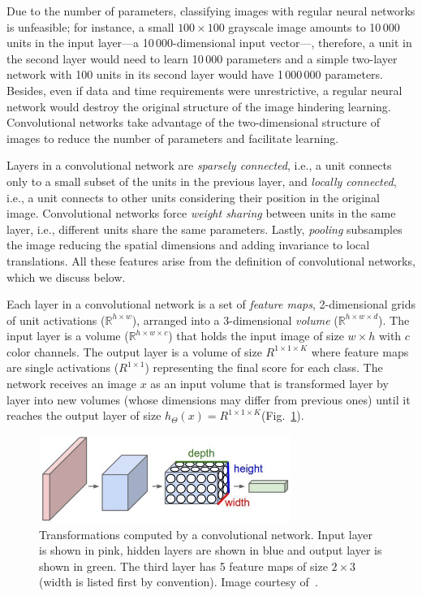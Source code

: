Due to the number of parameters, classifying images with regular neural networks is unfeasible; for instance, a small $100\times100$ grayscale image amounts to 10\,000 units in the input layer---a 10\,000-dimensional input vector---, therefore, a unit in the second layer would need to learn 10\,000 parameters and a simple two-layer network with 100 units in its second layer would have 1\,000\,000 parameters. Besides, even if data and time requirements were unrestrictive, a regular neural network would destroy the original structure of the image hindering learning. Convolutional networks take advantage of the two-dimensional structure of images to reduce the number of parameters and facilitate learning.

Layers in a convolutional network are \emph{sparsely connected}, i.e., a unit connects only to a small subset of the units in the previous layer, and \emph{locally connected}, i.e., a unit connects to other units considering their position in the original image. Convolutional networks force \emph{weight sharing} between units in the same layer, i.e., different units share the same parameters. Lastly, \emph{pooling} subsamples the image reducing the spatial dimensions and adding invariance to local translations. All these features arise from the definition of convolutional networks, which we discuss below.

Each layer in a convolutional network is a set of \emph{feature maps}, 2-dimensional grids of unit activations ($\mathbb{R}^{h\times w}$), arranged into a 3-dimensional \emph{volume} ($\mathbb{R}^{h\times w \times d}$).
The input layer is a volume ($\mathbb{R}^{h\times w \times c}$) that holds the input image of size $w\times h$ with $c$ color channels. The output layer is a volume of size $R^{1\times 1 \times K}$ where feature maps are single activations ($R^{1\times 1}$) representing the final score for each class. The network receives an image $x$ as an input volume that is transformed layer by layer into new volumes (whose dimensions may differ from previous ones) until it reaches the output layer of size $h_\Theta(x) = R^{1\times 1 \times K}$(Fig.~\ref{fig:ConvNetVolumes}).

\begin{figure}[h]
	\centering
	\includegraphics[width = 0.73\textwidth]{plots/convNetVolumes.jpeg}
	\caption[Illustration of a convolutional network]{Transformations computed by a convolutional network. Input layer is shown in pink, hidden layers are shown in blue and output layer is shown in green. The third layer has 5 feature maps of size $2\times3$ (width is listed first by convention). Image courtesy of~\cite{Karpathy2016}.}
	\label{fig:ConvNetVolumes}
\end{figure}

